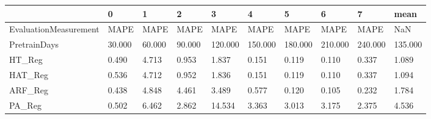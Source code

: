 \begin{tabular}{llllllllll}
\toprule
{} &      0 &      1 &      2 &       3 &       4 &       5 &       6 &       7 &    mean \\
\midrule
EvaluationMeasurement &   MAPE &   MAPE &   MAPE &    MAPE &    MAPE &    MAPE &    MAPE &    MAPE &     NaN \\
PretrainDays          & 30.000 & 60.000 & 90.000 & 120.000 & 150.000 & 180.000 & 210.000 & 240.000 & 135.000 \\
HT\_Reg                &  0.490 &  4.713 &  0.953 &   1.837 &   0.151 &   0.119 &   0.110 &   0.337 &   1.089 \\
HAT\_Reg               &  0.536 &  4.712 &  0.952 &   1.836 &   0.151 &   0.119 &   0.110 &   0.337 &   1.094 \\
ARF\_Reg               &  0.438 &  4.848 &  4.461 &   3.489 &   0.577 &   0.120 &   0.105 &   0.232 &   1.784 \\
PA\_Reg                &  0.502 &  6.462 &  2.862 &  14.534 &   3.363 &   3.013 &   3.175 &   2.375 &   4.536 \\
\bottomrule
\end{tabular}
